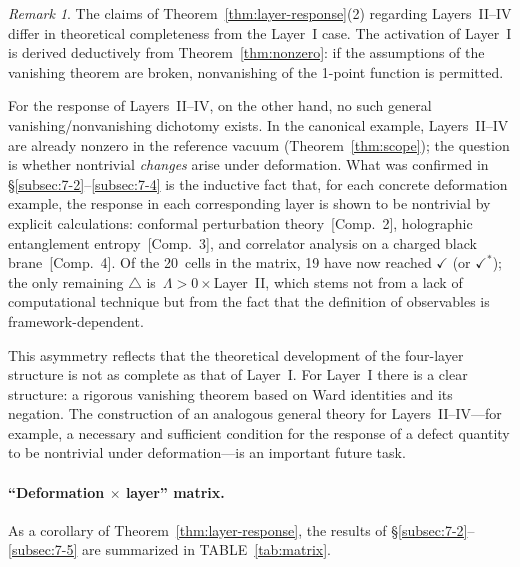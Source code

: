 \documentclass[
  aps,
  prd,
  preprint,
  groupedaddress,
  nofootinbib,
  longbibliography
]{revtex4-2}
\theoremstyle{remark}
\newtheorem{remark}[definition]{Remark}
\begin{document}
\begin{remark}\label{rem:layer-response-asymmetry}
The claims of Theorem~\ref{thm:layer-response}(2) regarding
Layers~II--IV differ in theoretical completeness from the
Layer~I case.
The activation of Layer~I is derived deductively from
Theorem~\ref{thm:nonzero}: if the assumptions of the vanishing
theorem are broken, nonvanishing of the 1-point function is
permitted.

For the response of Layers~II--IV, on the other hand, no such
general vanishing/nonvanishing dichotomy exists.
In the canonical example, Layers~II--IV are already nonzero in
the reference vacuum (Theorem~\ref{thm:scope}); the question is
whether nontrivial \emph{changes} arise under deformation.
What was confirmed in
\S\ref{subsec:7-2}--\ref{subsec:7-4}
is the inductive fact that, for each concrete deformation
example, the response in each corresponding layer is shown to
be nontrivial by explicit calculations: conformal perturbation
theory~[Comp.~2], holographic entanglement
entropy~[Comp.~3], and correlator analysis on a charged
black brane~[Comp.~4].
Of the 20~cells in the matrix, 19 have now reached
$\checkmark$ (or $\checkmark^*$); the only remaining
$\triangle$ is~$\Lambda>0\times$Layer~II, which stems not from
a lack of computational technique but from the fact that the
definition of observables is framework-dependent.

This asymmetry reflects that the theoretical development of the
four-layer structure is not as complete as that of Layer~I\@.
For Layer~I there is a clear structure: a rigorous vanishing
theorem based on Ward identities and its negation.
The construction of an analogous general theory for
Layers~II--IV---for example, a necessary and sufficient
condition for the response of a defect quantity to be nontrivial
under deformation---is an important future task.
\end{remark}

\paragraph{``Deformation $\times$ layer'' matrix.}
As a corollary of Theorem~\ref{thm:layer-response}, the results
of
\S\ref{subsec:7-2}--\ref{subsec:7-5}
are summarized in TABLE~\ref{tab:matrix}.
\end{document}
